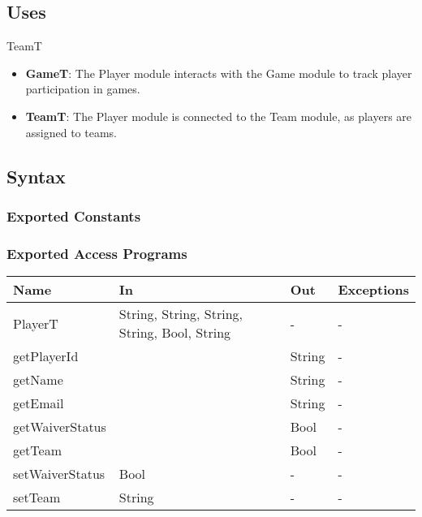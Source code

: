 \documentclass[12pt, titlepage]{article}
\begin{document}
\subsection{Uses}
TeamT
\begin{itemize}
  \item \textbf{GameT}: The Player module interacts with the Game module to track player participation in games.
  \item \textbf{TeamT}: The Player module is connected to the Team module, as players are assigned to teams.
\end{itemize}

\subsection{Syntax}

\subsubsection{Exported Constants}

\subsubsection{Exported Access Programs}

\begin{center}
  \begin{tabular}{|p{4cm}| p{4cm}| p{4cm} | p{3cm}|}
    \hline
    \textbf{Name}   & \textbf{In}                                  & \textbf{Out} & \textbf{Exceptions} \\
    \hline
    PlayerT         & String, String, String, String, Bool, String & -            & -                   \\
    getPlayerId     &                                              & String       & -                   \\
    getName         &                                              & String       & -                   \\
    getEmail        &                                              & String       & -                   \\
    getWaiverStatus &                                              & Bool         & -                   \\
    getTeam         &                                              & Bool         & -                   \\
    setWaiverStatus & Bool                                         & -            & -                   \\
    setTeam         & String                                       & -            & -                   \\
    \hline
  \end{tabular}
\end{center}
\end{document}
